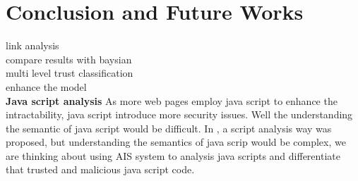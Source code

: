 \documentclass{llncs}
\begin{document}
\section{Conclusion and Future Works}
link analysis\\
compare results with baysian \\
multi level trust classification\\
enhance the model\\


\textbf{Java script analysis}
As more web pages employ java script to enhance the intractability, java script introduce more security issues. Well the understanding the semantic of java script would be difficult. In \cite{kruegel03:webanomaly}, a script analysis way was proposed, but understanding the semantics of java scrip would be complex, we are thinking about using AIS system to analysis java scripts and differentiate that trusted and malicious java script code.
\end{document}
